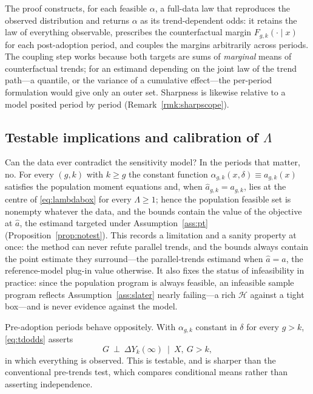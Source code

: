 \documentclass[12pt]{article}
\theoremstyle{remark}
\begin{document}
The proof constructs, for each feasible $\alpha$, a full-data law that reproduces the
observed distribution and returns $\alpha$ as its trend-dependent odds: it retains the law
of everything observable, prescribes the counterfactual margin $F_{g,k}(\cdot \mid x)$ for
each post-adoption period, and couples the margins arbitrarily across periods. The coupling
step works because both targets are sums of \emph{marginal} means of counterfactual
trends; for an estimand depending on the joint law of the trend path---a quantile, or the
variance of a cumulative effect---the per-period formulation would give only an outer set.
Sharpness is likewise relative to a model posited period by period
(Remark~\ref{rmk:sharpscope}).

\subsection{Testable implications and calibration of $\Lambda$}
\label{sec:testable}

Can the data ever contradict the sensitivity model? In the periods that matter, no. For
every $(g,k)$ with $k \ge g$ the constant function
$\alpha_{g,k}(x,\delta) \equiv a_{g,k}(x)$ satisfies the population moment equations and,
when $\widehat a_{g,k} = a_{g,k}$, lies at the centre of \eqref{eq:lambdabox} for every
$\Lambda \ge 1$; hence the population feasible set is nonempty whatever the data, and the
bounds contain the value of the objective at $\widehat a$, the estimand targeted under
Assumption~\ref{ass:pt} (Proposition~\ref{prop:notest}). This records a limitation and a
sanity property at once: the method can never refute parallel trends, and the bounds
always contain the point estimate they surround---the parallel-trends estimand when
$\widehat a = a$, the reference-model plug-in value otherwise. It also fixes the status of
infeasibility in practice: since the population program is always feasible, an infeasible
sample program reflects Assumption~\ref{ass:slater} nearly failing---a rich $\mathcal{H}$
against a tight box---and is never evidence against the model.

Pre-adoption periods behave oppositely. With $\alpha_{g,k}$ constant in $\delta$ for every
$g > k$, \eqref{eq:tdodds} asserts
\begin{equation}
G \ \perp\ \Delta Y_k(\infty) \ \mid\ X,\ G > k,
\label{eq:pretest}
\end{equation}
in which everything is observed. This is testable, and is sharper than the conventional
pre-trends test, which compares conditional means rather than asserting independence.
\end{document}
